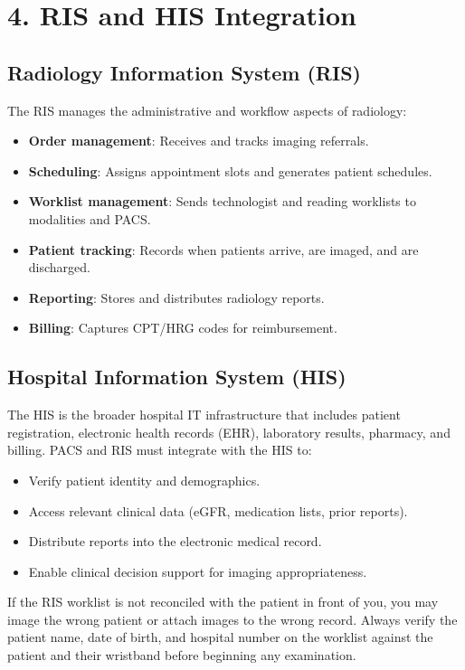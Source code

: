 \section*{4. RIS and HIS Integration}

\subsection*{Radiology Information System (RIS)}
The RIS manages the administrative and workflow aspects of radiology:
\begin{itemize}
    \item \textbf{Order management}: Receives and tracks imaging referrals.
    \item \textbf{Scheduling}: Assigns appointment slots and generates patient schedules.
    \item \textbf{Worklist management}: Sends technologist and reading worklists to modalities and PACS.
    \item \textbf{Patient tracking}: Records when patients arrive, are imaged, and are discharged.
    \item \textbf{Reporting}: Stores and distributes radiology reports.
    \item \textbf{Billing}: Captures CPT/HRG codes for reimbursement.
\end{itemize}

\subsection*{Hospital Information System (HIS)}
The HIS is the broader hospital IT infrastructure that includes patient registration, electronic health records (EHR), laboratory results, pharmacy, and billing. PACS and RIS must integrate with the HIS to:
\begin{itemize}
    \item Verify patient identity and demographics.
    \item Access relevant clinical data (eGFR, medication lists, prior reports).
    \item Distribute reports into the electronic medical record.
    \item Enable clinical decision support for imaging appropriateness.
\end{itemize}

\begin{pearlbox}
If the RIS worklist is not reconciled with the patient in front of you, you may image the wrong patient or attach images to the wrong record. Always verify the patient name, date of birth, and hospital number on the worklist against the patient and their wristband before beginning any examination.
\end{pearlbox}


